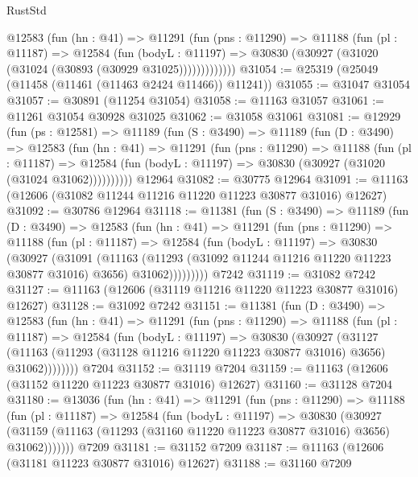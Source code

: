 \begin{lexlean}{RustStd}
\begin{coremodule}
          @12583
            (fun (hn : @41) =>
            @11291
              (fun (pns : @11290) =>
              @11188
                (fun (pl : @11187) =>
                @12584
                  (fun (bodyL : @11197) =>
                  @30830 (@30927 (@31020 (@31024 (@30893 (@30929 @31025)))))))))))))
@31054 := @25319 (@25049 (@11458 (@11461 (@11463 @2424 @11466)) @11241))
@31055 := @31047 @31054
@31057 := @30891 (@11254 @31054)
@31058 := @11163 @31057
@31061 := @11261 @31054 @30928 @31025
@31062 := @31058 @31061
@31081 := @12929
    (fun (ps : @12581) =>
    @11189
      (fun (S : @3490) =>
      @11189
        (fun (D : @3490) =>
        @12583
          (fun (hn : @41) =>
          @11291
            (fun (pns : @11290) =>
            @11188
              (fun (pl : @11187) =>
              @12584 (fun (bodyL : @11197) => @30830 (@30927 (@31020 (@31024 @31062))))))))))
    @12964
@31082 := @30775 @12964
@31091 := @11163 (@12606 (@31082 @11244 @11216 @11220 @11223 @30877 @31016) @12627)
@31092 := @30786 @12964
@31118 := @11381
    (fun (S : @3490) =>
    @11189
      (fun (D : @3490) =>
      @12583
        (fun (hn : @41) =>
        @11291
          (fun (pns : @11290) =>
          @11188
            (fun (pl : @11187) =>
            @12584
              (fun (bodyL : @11197) =>
              @30830
                (@30927
                  (@31091
                    (@11163
                      (@11293 (@31092 @11244 @11216 @11220 @11223 @30877 @31016) @3656)
                      @31062)))))))))
    @7242
@31119 := @31082 @7242
@31127 := @11163 (@12606 (@31119 @11216 @11220 @11223 @30877 @31016) @12627)
@31128 := @31092 @7242
@31151 := @11381
    (fun (D : @3490) =>
    @12583
      (fun (hn : @41) =>
      @11291
        (fun (pns : @11290) =>
        @11188
          (fun (pl : @11187) =>
          @12584
            (fun (bodyL : @11197) =>
            @30830
              (@30927
                (@31127
                  (@11163 (@11293 (@31128 @11216 @11220 @11223 @30877 @31016) @3656) @31062))))))))
    @7204
@31152 := @31119 @7204
@31159 := @11163 (@12606 (@31152 @11220 @11223 @30877 @31016) @12627)
@31160 := @31128 @7204
@31180 := @13036
    (fun (hn : @41) =>
    @11291
      (fun (pns : @11290) =>
      @11188
        (fun (pl : @11187) =>
        @12584
          (fun (bodyL : @11197) =>
          @30830
            (@30927
              (@31159 (@11163 (@11293 (@31160 @11220 @11223 @30877 @31016) @3656) @31062)))))))
    @7209
@31181 := @31152 @7209
@31187 := @11163 (@12606 (@31181 @11223 @30877 @31016) @12627)
@31188 := @31160 @7209

\end{coremodule}
\end{lexlean}

